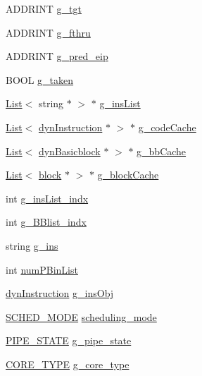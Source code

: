 \begin{DoxyCompactItemize}
\item 
ADDRINT \hyperlink{structg__variable_a34e0ec891cac1d35b52ed384463a0cf9}{g\_\-tgt}
\item 
ADDRINT \hyperlink{structg__variable_ab5c10d6f80328bc1f3c99709d7d5db46}{g\_\-fthru}
\item 
ADDRINT \hyperlink{structg__variable_a3dbb2ea81b5f338970379213c36590ee}{g\_\-pred\_\-eip}
\item 
BOOL \hyperlink{structg__variable_a992a1e746b4ab8d8ef422b522300f769}{g\_\-taken}
\item 
\hyperlink{classList}{List}$<$ string $\ast$ $>$ $\ast$ \hyperlink{structg__variable_a527a8f416e63493c83e0f6e50a6bdc79}{g\_\-insList}
\item 
\hyperlink{classList}{List}$<$ \hyperlink{classdynInstruction}{dynInstruction} $\ast$ $>$ $\ast$ \hyperlink{structg__variable_a51bca1da5081c41f7769211509c0358e}{g\_\-codeCache}
\item 
\hyperlink{classList}{List}$<$ \hyperlink{classdynBasicblock}{dynBasicblock} $\ast$ $>$ $\ast$ \hyperlink{structg__variable_a4e0c87db4791200f634d9730ec5dd419}{g\_\-bbCache}
\item 
\hyperlink{classList}{List}$<$ \hyperlink{classblock}{block} $\ast$ $>$ $\ast$ \hyperlink{structg__variable_aae812ea601e98de244787f6ae406f22b}{g\_\-blockCache}
\item 
int \hyperlink{structg__variable_aabbfa0530ffffdecf990fb2d64998f4e}{g\_\-insList\_\-indx}
\item 
int \hyperlink{structg__variable_a383af2308cefc8a72db47b1d7a41a702}{g\_\-BBlist\_\-indx}
\item 
string \hyperlink{structg__variable_aa7824f9bbc1a8ff7548bcf42922c0c2b}{g\_\-ins}
\item 
int \hyperlink{structg__variable_a1b0b5933340788334ca1884e1e63707e}{numPBinList}
\item 
\hyperlink{classdynInstruction}{dynInstruction} \hyperlink{structg__variable_aa245bb5b2c0655d82e43c16d5ee4a284}{g\_\-insObj}
\item 
\hyperlink{global_2global_8h_a22f16908f3dc0da817d3473222229453}{SCHED\_\-MODE} \hyperlink{structg__variable_a7434e481853a0e26d1c95da57ca20608}{scheduling\_\-mode}
\item 
\hyperlink{global_2global_8h_a06d96fbb727831f9371a39d5486ed5e0}{PIPE\_\-STATE} \hyperlink{structg__variable_a16962c0660efbbd6683962d295e85607}{g\_\-pipe\_\-state}
\item 
\hyperlink{global_2global_8h_ab65a1cfe05166d06195718a9587d7b86}{CORE\_\-TYPE} \hyperlink{structg__variable_a60e72fea014eafd97f1889956c63ca7b}{g\_\-core\_\-type}

\end{DoxyCompactItemize}
